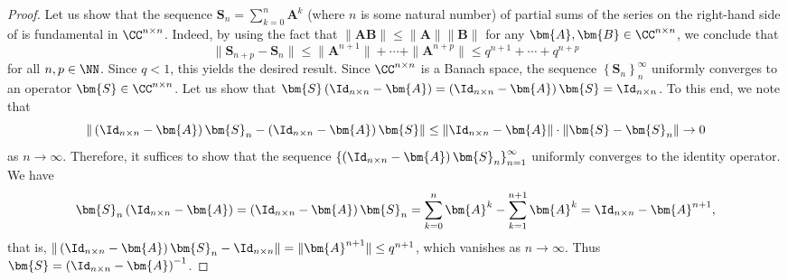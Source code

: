 \begin{proof}
    Let us show that the sequence $\bm{S}_{n} = \sum_{k=0}^{n} \bm{A}^k$ (where $n$ is some natural number) of partial sums of the series on the right-hand side of  is fundamental in $\CC^{n \times n}$. Indeed, by using the fact that $\| \bm{A B} \| \leq \| \bm{A} \| \| \bm{B} \|$ for any $\bm{A} , \bm{B} \in \CC^{n \times n}$, we conclude that
    \begin{equation*}
        \| \bm{S}_{n+p} - \bm{S}_{n} \| \leq \| \bm{A}^{n+1} \| + \cdots + \| \bm{A}^{n+p} \| \leq {q}^{n+1} + \cdots + {q}^{n+p}
    \end{equation*}
    for all $n,p \in \NN$. Since $q < 1$, this yields the desired result. Since $\CC^{n \times n}$ is a Banach space, the sequence $\left\{ \bm{S}_{n} \right\}_{n}^{\infty}$ uniformly converges to an operator $\bm{S} \in \CC^{n \times n}$. Let us show that $\bm{S} \left( \Id_{n \times n} - \bm{A} \right) = \left( \Id_{n \times n} - \bm{A} \right) \bm{S} = \Id_{n \times n}$. To this end, we note that
    \[
        \| \left( \Id_{n \times n} - \bm{A} \right) \bm{S}_n - \left( \Id_{n \times n} - \bm{A} \right) \bm{S} \| \leq \|  \Id_{n \times n} - \bm{A} \| \cdot \| \bm{S} - \bm{S}_{n} \| \to 0
    \]
    as $n \to \infty$. Therefore, it suffices to show that the sequence $\left\{ \left( \Id_{n \times n} - \bm{A} \right) \bm{S}_n \right\}_{n=1}^{\infty}$ uniformly converges to the identity operator. We have
    \[
        \bm{S}_{n} \left( \Id_{n \times n} - \bm{A} \right) = \left( \Id_{n \times n} - \bm{A} \right) \bm{S}_{n} = \sum_{k=0}^{n} \bm{A}^k - \sum_{k=1}^{n+1} \bm{A}^k = \Id_{n \times n} - \bm{A}^{n+1},
    \]
    that is, $\| \left( \Id_{n \times n} - \bm{A} \right) \bm{S}_{n} - \Id_{n \times n} \| = \| \bm{A}^{n+1} \| \leq q^{n+1}$, which vanishes as $n \to \infty$. Thus $\bm{S} = \left( \Id_{n \times n} - \bm{A} \right)^{-1}$.
\end{proof}

